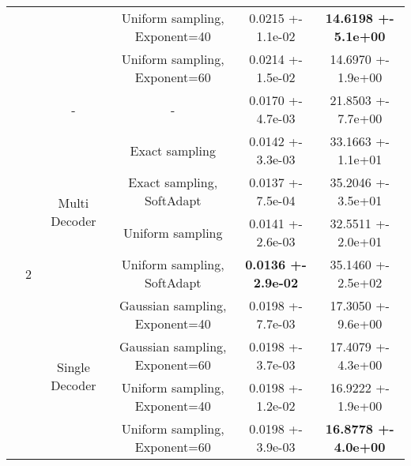 \begin{tabular}{||c|c|c|c|c|c||}
\cline{4-6}
 &  &  & Uniform sampling, Exponent=40 & 0.0215 +- 1.1e-02 & \textbf{14.6198 +- 5.1e+00} \\
\cline{4-6}
 &  &  & Uniform sampling, Exponent=60 & 0.0214 +- 1.5e-02 & 14.6970 +- 1.9e+00 \\
\cline{4-6}
\cline{3-6}
\cline{2-6}
 & \multirow{9}{*}{2} & \multirow{1}{*}{-} & - & 0.0170 +- 4.7e-03 & 21.8503 +- 7.7e+00 \\
\cline{4-6}
\cline{3-6}
 &  & \multirow{4}{*}{Multi Decoder} & Exact sampling & 0.0142 +- 3.3e-03 & 33.1663 +- 1.1e+01 \\
\cline{4-6}
 &  &  & Exact sampling, SoftAdapt & 0.0137 +- 7.5e-04 & 35.2046 +- 3.5e+01 \\
\cline{4-6}
 &  &  & Uniform sampling & 0.0141 +- 2.6e-03 & 32.5511 +- 2.0e+01 \\
\cline{4-6}
 &  &  & Uniform sampling, SoftAdapt & \textbf{0.0136 +- 2.9e-02} & 35.1460 +- 2.5e+02 \\
\cline{4-6}
\cline{3-6}
 &  & \multirow{4}{*}{Single Decoder} & Gaussian sampling, Exponent=40 & 0.0198 +- 7.7e-03 & 17.3050 +- 9.6e+00 \\
\cline{4-6}
 &  &  & Gaussian sampling, Exponent=60 & 0.0198 +- 3.7e-03 & 17.4079 +- 4.3e+00 \\
\cline{4-6}
 &  &  & Uniform sampling, Exponent=40 & 0.0198 +- 1.2e-02 & 16.9222 +- 1.9e+00 \\
\cline{4-6}
 &  &  & Uniform sampling, Exponent=60 & 0.0198 +- 3.9e-03 & \textbf{16.8778 +- 4.0e+00} \\
\cline{4-6}
\cline{3-6}
\cline{2-6}
\hline
\hline
\end{tabular}
